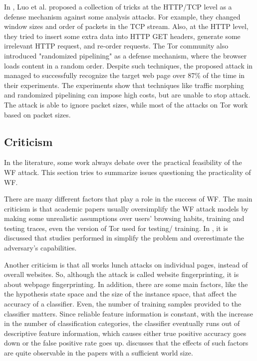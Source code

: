 In \cite{luo2011}, Luo et al. proposed a collection of tricks at the HTTP/TCP level as a defense mechanism against some analysis attacks. For example, they changed window sizes and order of packets in the TCP stream. Also, at the HTTP level, they tried to insert some extra data into HTTP GET headers, generate some irrelevant HTTP request, and re-order requests. The Tor community also introduced "randomized pipelining" \cite{perry11} as a defense mechanism, where the browser loads content in a random order. Despite such techniques, the proposed attack in \cite{cai2012touching} managed to successfully recognize the target web page over 87\% of the time in their experiments. The experiments show that techniques like traffic morphing and randomized pipelining can impose high costs, but are unable to stop attack. The attack is able to ignore packet sizes, while most of the attacks on Tor work based on packet sizes.

\subsection{Criticism}
In the literature, some work always debate over the practical feasibility of the WF attack. This section tries to summarize issues questioning the practicality of WF.

There are many different factors that play a role in the success of WF. The main criticism is that academic papers usually oversimplify the WF attack models by making some unrealistic assumptions over users' browsing habits, training and testing traces, even the version of Tor used for testing/ training. In \cite{juarez14}, it is discussed that studies performed in \cite{cai2012touching, herrmann2009, panchenko11, wang2013improved, shi2009} simplify the problem and overestimate the adversary's capabilities.

Another criticism is that all works lunch attacks on individual pages, instead of overall websites. So, although the attack is called website fingerprinting, it is about webpage fingerprinting. In addition, there are some main factors, like the the hypothesis state space and the size of the instance space, that affect the accuracy of a classifier. Even, the number of training samples provided to the classifier matters. Since reliable feature information is constant, with the increase in the number of classification categories, the classifier eventually runs out of descriptive feature information, which causes either true positive accuracy goes down or the false positive rate goes up. \cite{TorBlog} discusses that the effects of such factors are quite observable in the papers with a sufficient world size. 

